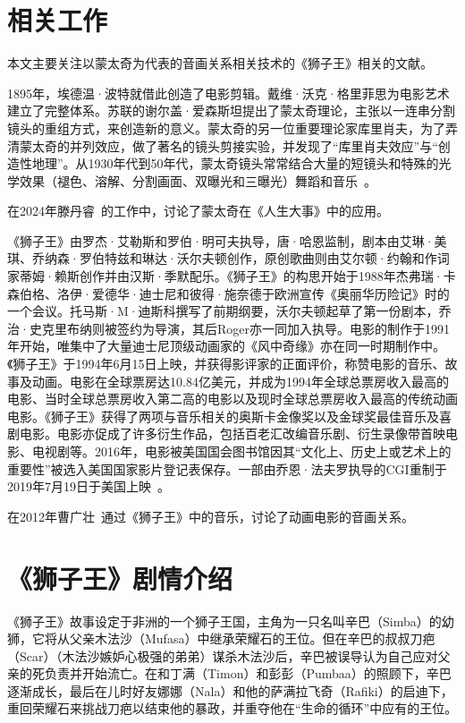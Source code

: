 \documentclass[final]{cvpr}
\begin{document}
\section{相关工作}
\label{sec:RelatedWorks}

本文主要关注以蒙太奇为代表的音画关系相关技术的《狮子王》相关的文献。

1895年，埃德温·波特就借此创造了电影剪辑。戴维·沃克·格里菲思为电影艺术建立了完整体系。苏联的谢尔盖·爱森斯坦提出了蒙太奇理论，主张以一连串分割镜头的重组方式，来创造新的意义。蒙太奇的另一位重要理论家库里肖夫，为了弄清蒙太奇的并列效应，做了著名的镜头剪接实验，并发现了“库里肖夫效应”与“创造性地理”。从1930年代到50年代，蒙太奇镜头常常结合大量的短镜头和特殊的光学效果（褪色、溶解、分割画面、双曝光和三曝光）舞蹈和音乐~\cite{wiki0}。

在2024年滕丹睿~\cite{a0}的工作中，讨论了蒙太奇在《人生大事》中的应用。

《狮子王》由罗杰·艾勒斯和罗伯·明可夫执导，唐·哈恩监制，剧本由艾琳·美琪、乔纳森·罗伯特兹和琳达·沃尔夫顿创作，原创歌曲则由艾尔顿·约翰和作词家蒂姆·赖斯创作并由汉斯·季默配乐。《狮子王》的构思开始于1988年杰弗瑞·卡森伯格、洛伊·爱德华·迪士尼和彼得·施奈德于欧洲宣传《奥丽华历险记》时的一个会议。托马斯·M·迪斯科撰写了前期纲要，沃尔夫顿起草了第一份剧本，乔治·史克里布纳则被签约为导演，其后Roger亦一同加入执导。电影的制作于1991年开始，唯集中了大量迪士尼顶级动画家的《风中奇缘》亦在同一时期制作中。《狮子王》于1994年6月15日上映，并获得影评家的正面评价，称赞电影的音乐、故事及动画。电影在全球票房达10.84亿美元，并成为1994年全球总票房收入最高的电影、当时全球总票房收入第二高的电影以及现时全球总票房收入最高的传统动画电影。《狮子王》获得了两项与音乐相关的奥斯卡金像奖以及金球奖最佳音乐及喜剧电影。电影亦促成了许多衍生作品，包括百老汇改编音乐剧、衍生录像带首映电影、电视剧等。2016年，电影被美国国会图书馆因其“文化上、历史上或艺术上的重要性”被选入美国国家影片登记表保存。一部由乔恩·法夫罗执导的CGI重制于2019年7月19日于美国上映~\cite{wiki1}。

在2012年曹广壮~\cite{a1}通过《狮子王》中的音乐，讨论了动画电影的音画关系。

\section{《狮子王》剧情介绍}\label{sec:HC}

《狮子王》故事设定于非洲的一个狮子王国，主角为一只名叫辛巴（Simba）的幼狮，它将从父亲木法沙（Mufasa）中继承荣耀石的王位。但在辛巴的叔叔刀疤（Scar）（木法沙嫉妒心极强的弟弟）谋杀木法沙后，辛巴被误导认为自己应对父亲的死负责并开始流亡。在和丁满（Timon）和彭彭（Pumbaa）的照顾下，辛巴逐渐成长，最后在儿时好友娜娜（Nala）和他的萨满拉飞奇（Rafiki）的启迪下，重回荣耀石来挑战刀疤以结束他的暴政，并重夺他在“生命的循环”中应有的王位。
\end{document}
